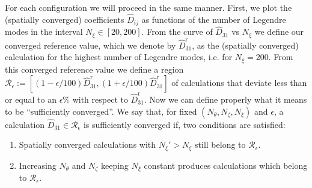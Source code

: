%




For each configuration we will proceed in the same manner. First, we plot the (spatially converged) coefficients $\widehat{D}_{ij}$ as functions of the number of Legendre modes in the interval $N_\xi \in [20,200]$. From the curve of $\widehat{D}_{31}$ vs $N_\xi$ we define our converged reference value, which we denote by $\widehat{D}_{31}^{\text{r}}$, as the (spatially converged) calculation for the highest number of Legendre modes, i.e. for $N_\xi=200$. From this converged reference value we define a region $\mathcal{R}_{\epsilon}:=[(1-\epsilon/100)\widehat{D}_{31}^{\text{r}}, (1+\epsilon/100)\widehat{D}_{31}^{\text{r}} ]$ of calculations that deviate less than or equal to an $\epsilon$\% with respect to $\widehat{D}_{31}^{\text{r}}$. Now we can define properly what it means to be ``sufficiently converged''. We say that, for fixed $(N_\theta,N_\zeta,N_\xi)$ and $\epsilon$, a calculation $\widehat{D}_{31}\in\mathcal{R}_{\epsilon}$ is sufficiently converged if, two conditions are satisfied:
%
\begin{enumerate}
	\item Spatially converged calculations with $N_\xi'>N_\xi$ still belong to $\mathcal{R}_{\epsilon}$.
	\item Increasing $N_\theta$ and $N_\zeta$ keeping $N_\xi$ constant produces calculations which belong to $\mathcal{R}_{\epsilon}$.
\end{enumerate}

